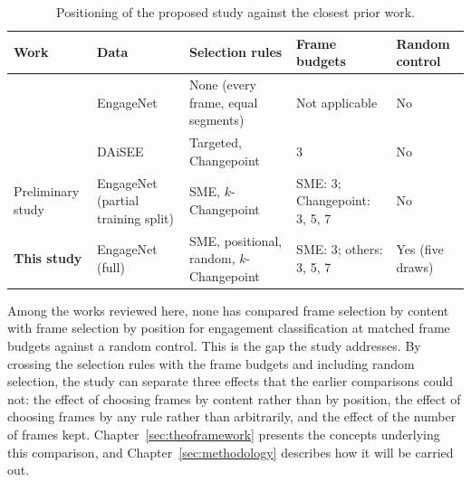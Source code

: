 \begin{table}[t]
   \centering
   \caption[Positioning of the proposed study]{Positioning of the proposed study against the closest prior work.}
   \label{tab:rw-positioning}
   \small
   \begin{tabular}{L{2.4cm}L{2.0cm}L{3.2cm}L{2.3cm}L{1.8cm}}
      \toprule
      Work & Data & Selection rules & Frame budgets & Random control \\
      \midrule
       & EngageNet & None (every frame, equal segments) & Not applicable & No \\
       & DAiSEE & Targeted, Changepoint & 3 & No \\
      Preliminary study & EngageNet (partial training split) & SME, $k$-Changepoint & SME: 3; Changepoint: 3, 5, 7 & No \\
      \textbf{This study} & EngageNet (full) & SME, positional, random, $k$-Changepoint & SME: 3; others: 3, 5, 7 & Yes (five draws) \\
      \bottomrule
   \end{tabular}
\end{table}

Among the works reviewed here, none has compared frame selection by content with frame selection by position for engagement classification at matched frame budgets against a random control. This is the gap the study addresses. By crossing the selection rules with the frame budgets and including random selection, the study can separate three effects that the earlier comparisons could not: the effect of choosing frames by content rather than by position, the effect of choosing frames by any rule rather than arbitrarily, and the effect of the number of frames kept. Chapter~\ref{sec:theoframework} presents the concepts underlying this comparison, and Chapter~\ref{sec:methodology} describes how it will be carried out.
